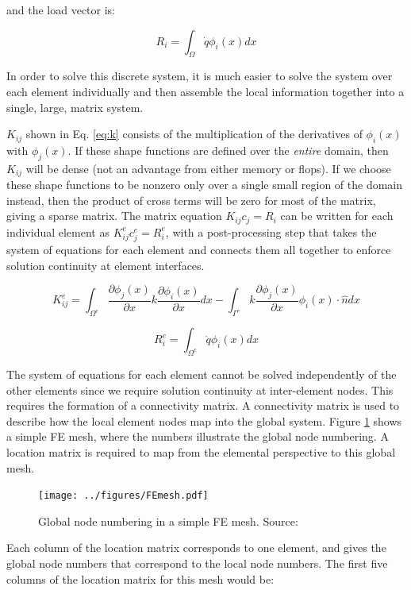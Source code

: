 \documentclass[10pt]{article}
\newcommand{\beq}{\begin{equation}}
\newcommand{\eeq}{\end{equation}}
\begin{document}
and the load vector is:

\beq
R_{i}=\int_{\Omega}\dot{q}\phi_i(x)dx
\eeq

In order to solve this discrete system, it is much easier to solve the system over each element individually and then assemble the local information together into a single, large, matrix system. 

\(K_{ij}\) shown in Eq. \eqref{eq:k} consists of the multiplication of the derivatives of \(\phi_i(x)\) with \(\phi_j(x)\). If these shape functions are defined over the {\it entire} domain, then \(K_{ij}\) will be dense (not an advantage from either memory or flops). If we choose these shape functions to be nonzero only over a single small region of the domain instead, then the product of cross terms will be zero for most of the matrix, giving a sparse matrix. The matrix equation \(K_{ij}c_j=R_i\) can be written for each individual element as \(K_{ij}^ec_j^e=R_i^e\), with a post-processing step that takes the system of equations for each element and connects them all together to enforce solution continuity at element interfaces. 

\beq
K_{ij}^e=\int_{\Omega^e}\frac{\partial \phi_j(x)}{\partial x}k\frac{\partial\phi_i(x)}{\partial x}dx-\int_{\Gamma^e}k\frac{\partial \phi_j(x)}{\partial x}\phi_i(x)\cdot\hat{n}dx
\eeq

\beq
R_{i}^e=\int_{\Omega^e}\dot{q}\phi_i(x)dx
\eeq

The system of equations for each element cannot be solved independently of the other elements since we require solution continuity at inter-element nodes. This requires the formation of a connectivity matrix. A connectivity matrix is used to describe how the local element nodes map into the global system. Figure \ref{fig:FEmesh} shows a simple FE mesh, where the numbers illustrate the global node numbering. A location matrix is required to map from the elemental perspective to this global mesh. 

\begin{figure}[H]
\centering
\texttt{[image: ../figures/FEmesh.pdf]}
\caption{Global node numbering in a simple FE mesh. Source:}
\label{fig:FEmesh}
\end{figure}

Each column of the location matrix corresponds to one element, and gives the global node numbers that correspond to the local node numbers. The first five columns of the location matrix for this mesh would be:
\end{document}
